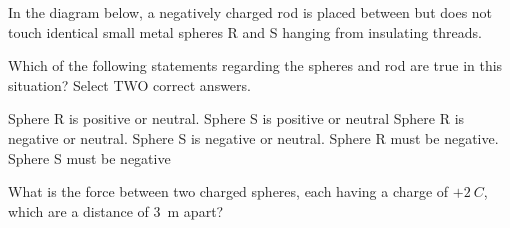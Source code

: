 \documentclass[]{exam}
\begin{document}
\begin{questions}
\question
In the diagram below, a negatively charged rod is placed between but does not touch identical small metal spheres R and S hanging from insulating threads. 

\begin{center}


\end{center}

Which of the following statements regarding the spheres and rod are true in this situation? Select TWO correct answers.

\begin{randomizechoices}
    \choice Sphere R is positive or neutral.
    \choice Sphere S is positive or neutral
    \choice Sphere R is negative or neutral.
    \choice Sphere S is negative or neutral.
    \choice Sphere R must be negative.
    \choice Sphere S must be negative
\end{randomizechoices}


\question
What is the force between two charged spheres, each having a charge of $+\SI{2}{C}$, which are a distance of \SI{3}{m} apart?


\end{questions}
\end{document}
